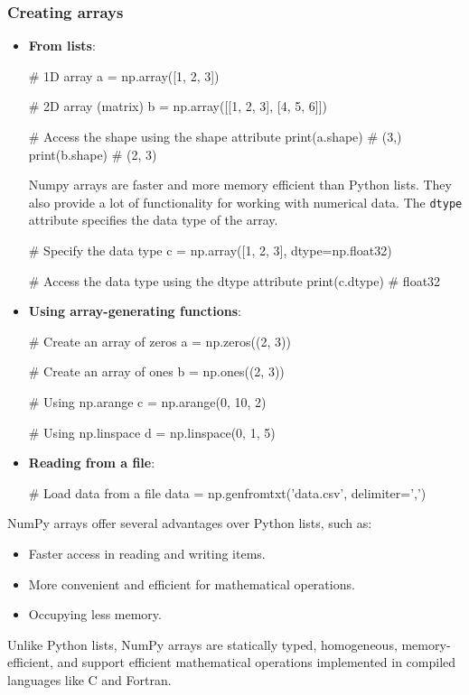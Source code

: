 \subsubsection*{Creating arrays}
\begin{itemize}
    \item \textbf{From lists}:
    \begin{codeblock}[language=python]
    # 1D array
    a = np.array([1, 2, 3])

    # 2D array (matrix)
    b = np.array([[1, 2, 3], [4, 5, 6]])

    # Access the shape using the shape attribute
    print(a.shape)  # (3,)
    print(b.shape)  # (2, 3)
    \end{codeblock}

    Numpy arrays are faster and more memory efficient than Python lists. They also provide a lot of
    functionality for working with numerical data.
    The \texttt{dtype} attribute specifies the data type of the array.
    \begin{codeblock}[language=python]
    # Specify the data type
    c = np.array([1, 2, 3], dtype=np.float32)

    # Access the data type using the dtype attribute
    print(c.dtype)  # float32
    \end{codeblock}

    \item \textbf{Using array-generating functions}:
    \begin{codeblock}[language=python]
    # Create an array of zeros
    a = np.zeros((2, 3))

    # Create an array of ones
    b = np.ones((2, 3))

    # Using np.arange
    c = np.arange(0, 10, 2)

    # Using np.linspace
    d = np.linspace(0, 1, 5)
    \end{codeblock}

    \item \textbf{Reading from a file}:
    \begin{codeblock}[language=python]
    # Load data from a file
    data = np.genfromtxt('data.csv', delimiter=',')
    \end{codeblock}
\end{itemize}
    
\begin{observationblock}
    NumPy arrays offer several advantages over Python lists, such as:
    \begin{itemize}
        \item Faster access in reading and writing items.
        \item More convenient and efficient for mathematical operations.
        \item Occupying less memory.
    \end{itemize}
    Unlike Python lists, NumPy arrays are statically typed, homogeneous, memory-efficient, and support efficient mathematical operations implemented in compiled languages like C and Fortran.
\end{observationblock}

